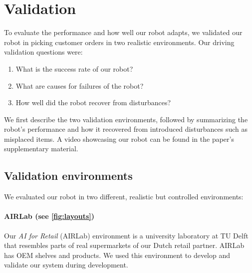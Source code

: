 \section{Validation}
\label{sec:rss24_results}

To evaluate the performance and how well our robot adapts, we validated our robot in picking customer orders in two realistic environments.
Our driving validation questions were:
\begin{enumerate}
    \item What is the success rate of our robot?
    \item What are causes for failures of the robot?
    \item How well did the robot recover from disturbances?
\end{enumerate}
We first describe the two validation environments, followed by summarizing the robot's performance and  how it recovered from introduced disturbances such as misplaced items.
A video showcasing our robot can be found in the paper's supplementary material.







\subsection{Validation environments}
We evaluated our robot in two different, realistic but controlled environments: 
\paragraph{AIRLab (see \cref{fig:layouts})}
Our \emph{AI for Retail} (AIRLab) environment is a university laboratory at TU Delft that resembles parts of real supermarkets of our Dutch retail partner.
AIRLab has OEM shelves and products. 
We used this environment to develop and validate our system during development.

